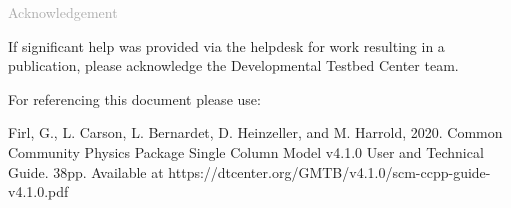 \begin{titlepage}
\vspace*{0.5cm}
\noindent

\begin{flushleft}
\textcolor{darkgray}{\LARGE Acknowledgement}
\vspace*{1cm}\par

If significant help was provided via the helpdesk for work resulting in a publication, please acknowledge the Developmental Testbed Center team.\\
\vspace*{1cm}\par
For referencing this document please use:\\
\vspace*{1cm}\par
Firl, G., L. Carson, L. Bernardet, D. Heinzeller, and M. Harrold, 2020. Common Community Physics Package Single Column Model v4.1.0 User and Technical Guide. 38pp. Available at https://dtcenter.org/GMTB/v4.1.0/scm-ccpp-guide-v4.1.0.pdf

\end{flushleft}
\end{titlepage}
\pagebreak{}
